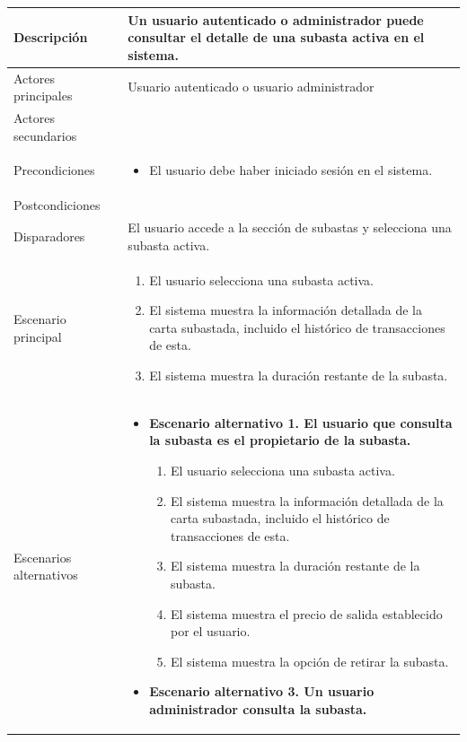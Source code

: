 \begin{longtable}{
    >{\columncolor{lightgreen!20}}p{4cm}
    p{12cm}
    }
    \midrule
    Descripción & Un usuario autenticado o administrador puede consultar el detalle de una subasta activa en el sistema. \\
    \midrule
    Actores principales & Usuario autenticado o usuario administrador \\
    \midrule
    Actores secundarios &  \\
    \midrule
    Precondiciones & \begin{itemize}[nosep,leftmargin=*]
        \item El usuario debe haber iniciado sesión en el sistema.
    \end{itemize} \\
    \midrule
    Postcondiciones &  \\
    \midrule
    Disparadores & El usuario accede a la sección de subastas y selecciona una subasta activa. \\
    \midrule
    Escenario principal & \begin{enumerate}[nosep,leftmargin=*]
        \item El usuario selecciona una subasta activa.
        \item El sistema muestra la información detallada de la carta subastada, incluido el histórico de transacciones de esta.
        \item El sistema muestra la duración restante de la subasta.
    \end{enumerate} \\
    \midrule
    Escenarios alternativos & 
    \begin{itemize}[nosep,leftmargin=*]
        \item \textbf{Escenario alternativo 1. El usuario que consulta la subasta es el propietario de la subasta.}
        \begin{enumerate}[nosep,leftmargin=*]
            \item El usuario selecciona una subasta activa.
            \item El sistema muestra la información detallada de la carta subastada, incluido el histórico de transacciones de esta.
            \item El sistema muestra la duración restante de la subasta.
            \item El sistema muestra el precio de salida establecido por el usuario.
            \item El sistema muestra la opción de retirar la subasta.
        \end{enumerate}
        \item \textbf{Escenario alternativo 3. Un usuario administrador consulta la subasta.}

\end{itemize}
\end{longtable}
